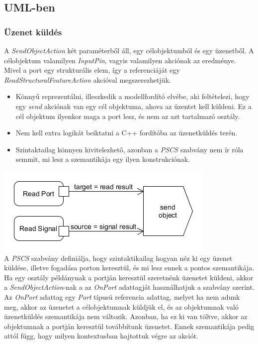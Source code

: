 \documentclass[a4paper,12pt]{report}
\begin{document}
\subsection{UML-ben}

\subsubsection{Üzenet küldés}
A  \textit{SendObjectAction} két paraméterből áll, egy célobjektumból és egy üzenetből.
A célobjektum valamilyen \textit{InputPin}, vagyis valamilyen akciónak az eredménye.
Mivel a port egy strukturális elem, így a referenciáját egy \textit{ReadStructuralFeatureAction} akcióval megszerezhetjük. 
\begin{itemize}
\item Könnyű reprezentálni, illeszkedik a modellfordító elvébe, aki feltételezi, hogy
egy \textit{send} akciónak van egy cél objektuma, ahova az üzentet kell küldeni. Ez a cél objektum ilyenkor maga a port lesz, és nem az azt tartalmazó osztály.
\item Nem kell extra logikát beiktatni a C++ fordítóba az üzenetküldés terén.
\item Szintaktailag könnyen kivitelezhető, azonban a \textit{PSCS} szabvány nem ír róla semmit, mi lesz a szemantikája egy ilyen konstrukciónak.
\end{itemize}

\includegraphics[scale=0.8]{send_uml.png} \\

A \textit{PSCS} szabvány definiálja, hogy szintaktikailag hogyan néz ki egy üzenet küldése, illetve fogadása porton keresztül, és mi lesz ennek a pontos szemantikája. \\
Ha egy osztály példánynak a portján keresztül szeretnénk üzenetet küldeni, akkor a \textit{SendObjectAction}-nak a az \textit{OnPort} adattagját használhatjuk a szabvány szerint.  Az \textit{OnPort} adattag egy \textit{Port} típusú referencia adattag, melyet ha nem adunk meg, akkor az üzenetet a célobjektumnak küldjük el, és az objektumnak való üzenetküldés szemantikája nem változik.  Azonban, ha ez ki van töltve, akkor az objektumnak a portján keresztül továbbítunk üzenetet. Ennek szemantikája pedig attól függ, hogy milyen kontextusban hajtottuk végre az akciót. \\
\end{document}
